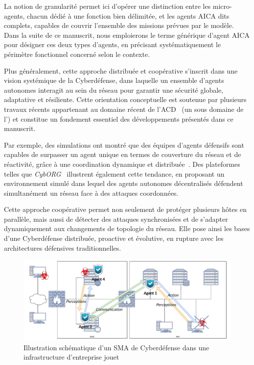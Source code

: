 La notion de granularité permet ici d'opérer une distinction entre les micro-agents, chacun dédié à une fonction bien délimitée, et les agents \ac{AICA} dits complets, capables de couvrir l'ensemble des missions prévues par le modèle. Dans la suite de ce manuscrit, nous emploierons le terme générique d'agent \ac{AICA} pour désigner ces deux types d'agents, en précisant systématiquement le périmètre fonctionnel concerné selon le contexte.

Plus généralement, cette approche distribuée et coopérative s'inscrit dans une vision systémique de la Cyberdéfense, dans laquelle un ensemble d'agents autonomes interagit au sein du réseau pour garantir une sécurité globale, adaptative et résiliente. Cette orientation conceptuelle est soutenue par plusieurs travaux récents appartenant au domaine récent de l'\ac{ACD}~\cite{Vyas2023} (un sous domaine de l') et constitue un fondement essentiel des développements présentés dans ce manuscrit.


Par exemple, des simulations ont montré que des équipes d'agents défensifs sont capables de surpasser un agent unique en termes de couverture du réseau et de réactivité, grâce à une coordination dynamique et distribuée~\cite{RLResilientCyberdefense2024}.
Des plateformes telles que \textit{CybORG}~\cite{cage_challenge_3_announcement} illustrent également cette tendance, en proposant un environnement simulé dans lequel des agents autonomes décentralisés défendent simultanément un réseau face à des attaques coordonnées.

Cette approche coopérative permet non seulement de protéger plusieurs hôtes en parallèle, mais aussi de détecter des attaques synchronisées et de s'adapter dynamiquement aux changements de topologie du réseau. Elle pose ainsi les bases d'une Cyberdéfense distribuée, proactive et évolutive, en rupture avec les architectures défensives traditionnelles.


\begin{figure}[h]
    \centering
    \includegraphics[width=\linewidth]{figures/infra_MAS_illustration.pdf}
    \caption{Illustration schématique d'un SMA de Cyberdéfense dans une infrastructure d'entreprise jouet}
    \label{fig:distributed_sma}
\end{figure}

